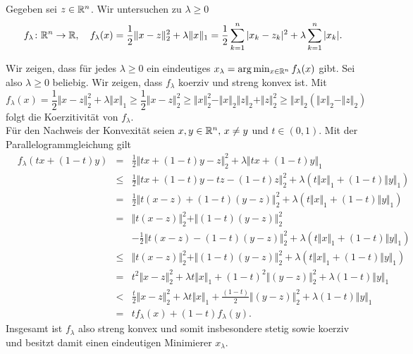 
Gegeben sei $z\in\mathbb{R}^n$. Wir untersuchen zu $\lambda\geq 0$
\begin{displaymath}
 f_\lambda\colon \mathbb{R}^n\to\mathbb{R},\quad f_\lambda(x)=\frac{1}{2}\Vert x-z\Vert_2^2+\lambda\Vert x\Vert_1=\frac{1}{2}\sum_{k=1}^n |x_k-z_k|^2+\lambda\sum_{k=1}^n|x_k|.
\end{displaymath}
\begin{compactenum}[(i)]
 \item Wir zeigen, dass für jedes $\lambda\geq 0$ ein eindeutiges $x_\lambda = \arg\min_{x\in\mathbb{R}^n}f_\lambda(x)$ gibt. Sei also $\lambda\geq 0$ beliebig.
 Wir zeigen, dass $f_\lambda$ koerziv und streng konvex ist. Mit
 \begin{displaymath}
  f_\lambda(x)=\frac{1}{2}\Vert x-z\Vert_2^2+\lambda\Vert x\Vert_1\geq \frac{1}{2}\Vert x-z\Vert_2^2\geq \Vert x\Vert_2^2-\Vert x\Vert_2\Vert z\Vert_2+\Vert z \Vert_2^2\geq \Vert x\Vert_2(\Vert x\Vert_2-\Vert z\Vert_2)
 \end{displaymath}
 folgt die Koerzitivität von $f_\lambda$.\\
 Für den Nachweis der Konvexität seien $x,y\in\mathbb{R}^n,\,x\neq y$ und $t\in(0,1)$. Mit der Parallelogrammgleichung gilt
 \begin{align*}
  &f_\lambda(tx+(1-t)y)&=&\frac{1}{2}\Vert tx+(1-t)y-z\Vert_2^2+\lambda\Vert tx+(1-t)y\Vert_1\\
  &&\leq& \frac{1}{2}\Vert tx+(1-t)y-tz-(1-t)z\Vert_2^2+\lambda(t\Vert x\Vert_1+(1-t)\Vert y\Vert_1)\\
  &&=&\frac{1}{2}\Vert t(x-z)+(1-t)(y-z)\Vert_2^2+\lambda(t\Vert x\Vert_1+(1-t)\Vert y\Vert_1)\\
  &&=&\Vert t(x-z)\Vert_2^2+\Vert(1-t)(y-z)\Vert_2^2\\&&&-\frac{1}{2}\Vert t(x-z)-(1-t)(y-z)\Vert_2^2 +\lambda(t\Vert x\Vert_1+(1-t)\Vert y\Vert_1)\\
  &&\leq&\Vert t(x-z)\Vert_2^2+\Vert(1-t)(y-z)\Vert_2^2 +\lambda(t\Vert x\Vert_1+(1-t)\Vert y\Vert_1)\\
  &&=&t^2\Vert x-z\Vert_2^2+\lambda t\Vert x\Vert_1+(1-t)^2\Vert(y-z)\Vert_2^2 +\lambda(1-t)\Vert y\Vert_1\\
  &&<&\frac{t}{2}\Vert x-z\Vert_2^2+\lambda t\Vert x\Vert_1+\frac{(1-t)}{2}\Vert(y-z)\Vert_2^2 +\lambda(1-t)\Vert y\Vert_1\\
  &&=&t f_\lambda(x)+(1-t) f_\lambda(y).
 \end{align*}
 Insgesamt ist $f_\lambda$ also streng konvex und somit insbesondere stetig sowie koerziv und besitzt damit einen eindeutigen Minimierer $x_\lambda$.
 \\


\end{compactenum}

